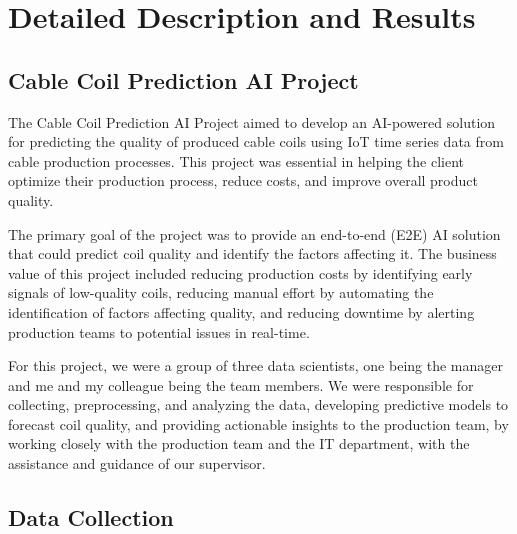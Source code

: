 \chapter{Detailed Description and Results}
\label{sec:results-int}

\section{Cable Coil Prediction AI Project}

The Cable Coil Prediction AI Project aimed to develop an AI-powered solution
for predicting the quality of produced cable coils using IoT time series data
from cable production processes. This project was essential in helping the
client optimize their production process, reduce costs, and improve overall
product quality.

The primary goal of the project was to provide an end-to-end (E2E) AI solution
that could predict coil quality and identify the factors affecting it. The
business value of this project included reducing production costs by
identifying early signals of low-quality coils, reducing manual effort by
automating the identification of factors affecting quality, and reducing
downtime by alerting production teams to potential issues in real-time.

For this project, we were a group of three data scientists, one being the
manager and me and my colleague being the team members. We were responsible for
collecting, preprocessing, and analyzing the data, developing predictive models
to forecast coil quality, and providing actionable insights to the production
team, by working closely with the production team and the IT department, with
the assistance and guidance of our supervisor.

\section{Data Collection}

